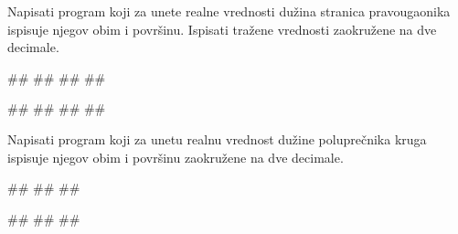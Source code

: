 \begin{Exercise}[label=p1.1_02] 
Napisati program koji za unete realne vrednosti dužina stranica pravougaonika ispisuje njegov obim i površinu. Ispisati tražene vrednosti zaokružene na dve decimale.

\begin{miditest}
\begin{upotreba}{1}
#\naslovInt#
##
##
##
\end{upotreba}
\end{miditest}
\begin{miditest}
\begin{upotreba}{2}
#\naslovInt#
##
##
##
\end{upotreba}
\end{miditest}

\end{Exercise}
\begin{Answer}[ref=p1.1_02]
\end{Answer}

\begin{Exercise}[label=v1.1_04] 
Napisati program koji za unetu realnu vrednost dužine poluprečnika kruga ispisuje njegov obim i površinu zaokružene na dve decimale. 
      
\begin{miditest}
\begin{upotreba}{1}
#\naslovInt#
##
##
\end{upotreba}
\end{miditest}
\begin{miditest}
\begin{upotreba}{2}
#\naslovInt#
##
##
\end{upotreba}
\end{miditest}   
   
\end{Exercise}
\begin{Answer}[ref=v1.1_04]
\end{Answer}


